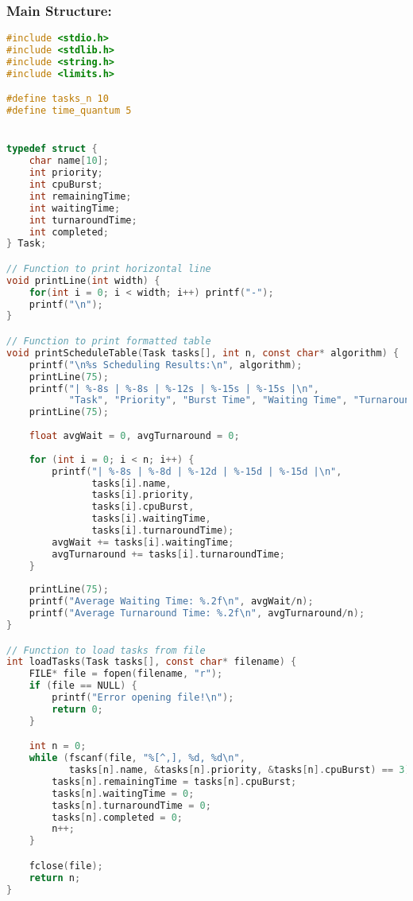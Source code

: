\documentclass{article}
\begin{document}
\subsubsection*{Main Structure:}
\begin{lstlisting}[language=C, caption=Scheduling Code ]
#include <stdio.h>
#include <stdlib.h>
#include <string.h>
#include <limits.h>

#define tasks_n 10
#define time_quantum 5


typedef struct {
    char name[10];
    int priority;
    int cpuBurst;
    int remainingTime;
    int waitingTime;
    int turnaroundTime;
    int completed;
} Task;

// Function to print horizontal line
void printLine(int width) {
    for(int i = 0; i < width; i++) printf("-");
    printf("\n");
}

// Function to print formatted table
void printScheduleTable(Task tasks[], int n, const char* algorithm) {
    printf("\n%s Scheduling Results:\n", algorithm);
    printLine(75);
    printf("| %-8s | %-8s | %-12s | %-15s | %-15s |\n", 
           "Task", "Priority", "Burst Time", "Waiting Time", "Turnaround Time");
    printLine(75);
    
    float avgWait = 0, avgTurnaround = 0;
    
    for (int i = 0; i < n; i++) {
        printf("| %-8s | %-8d | %-12d | %-15d | %-15d |\n",
               tasks[i].name, 
               tasks[i].priority,
               tasks[i].cpuBurst,
               tasks[i].waitingTime,
               tasks[i].turnaroundTime);
        avgWait += tasks[i].waitingTime;
        avgTurnaround += tasks[i].turnaroundTime;
    }
    
    printLine(75);
    printf("Average Waiting Time: %.2f\n", avgWait/n);
    printf("Average Turnaround Time: %.2f\n", avgTurnaround/n);
}

// Function to load tasks from file
int loadTasks(Task tasks[], const char* filename) {
    FILE* file = fopen(filename, "r");
    if (file == NULL) {
        printf("Error opening file!\n");
        return 0;
    }

    int n = 0;
    while (fscanf(file, "%[^,], %d, %d\n", 
           tasks[n].name, &tasks[n].priority, &tasks[n].cpuBurst) == 3) {
        tasks[n].remainingTime = tasks[n].cpuBurst;
        tasks[n].waitingTime = 0;
        tasks[n].turnaroundTime = 0;
        tasks[n].completed = 0;
        n++;
    }

    fclose(file);
    return n;
}


\end{lstlisting}
\end{document}
